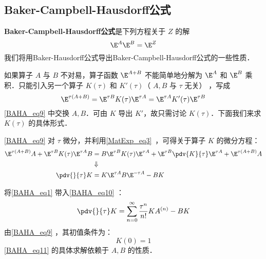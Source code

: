 \subsection{Baker-Campbell-Hausdorff公式}
\textbf{Baker-Campbell-Hausdorff公式}是下列方程关于 $Z$ 的解
\begin{equation}
\E^{A}\E^{B}=\E^{Z}
\end{equation}
我们将用Baker-Hausdorff公式导出Baker-Campbell-Hausdorff公式的一些性质．

如果算子 $A$ 与 $B$ 不对易，算子函数 $\E^{A+B}$ 不能简单地分解为  $\E^{A}$ 和 $\E^{B}$ 乘积．只能引入另一个算子 $K(\tau)$ 和 $K'(\tau)$（ $A,B$ 与 $\tau$ 无关） ，写成
\begin{equation}\label{BAHA_eq9}
\E^{\tau(A+B)}=\E^{\tau B}K(\tau)\E^{\tau A}=\E^{\tau A}K'(\tau)\E^{\tau B}
\end{equation}
\autoref{BAHA_eq9} 中交换 $A,B$．可由 $K$ 导出 $K'$，故只需讨论 $K(\tau)$．下面我们来求 $K(\tau)$ 的具体形式．

\autoref{BAHA_eq9} 对 $\tau$ 微分，并利用\autoref{MatExp_eq3}~，可得关于算子 $K$ 的微分方程：
\begin{equation}\label{BAHA_eq10}
\begin{aligned}
\E^{\tau(A+B)}A+\E^{\tau B}K(\tau)\E^{\tau A}B&=B\E^{\tau B}K(\tau)\E^{\tau A}+\E^{\tau B}\pdv{K}{\tau}\E^{\tau A}+\E^{\tau(A+B)}A\\
&\Downarrow\\
\pdv{}{\tau}K&=K\E^{\tau A}B\E^{-\tau A}-BK
\end{aligned}
\end{equation}

将\autoref{BAHA_eq1} 带入\autoref{BAHA_eq10} ：
\begin{equation}\label{BAHA_eq11}
\pdv{}{\tau}K=\sum_{n=0}^{\infty}\frac{\tau^n}{n!}KA^{(n)}-BK
\end{equation}
由\autoref{BAHA_eq9} ，其初值条件为：
\begin{equation}
K(0)=1
\end{equation}
\autoref{BAHA_eq11} 的具体求解依赖于 $A,B$ 的性质．

